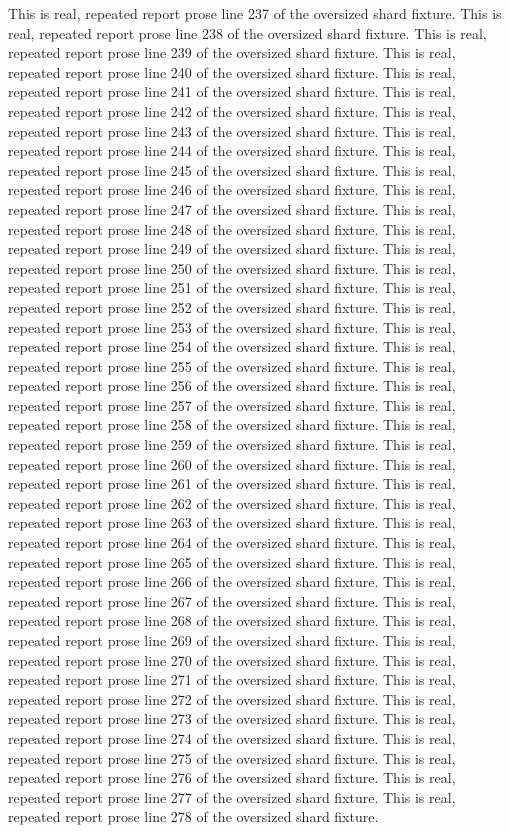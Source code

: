 This is real, repeated report prose line 237 of the oversized shard fixture.
This is real, repeated report prose line 238 of the oversized shard fixture.
This is real, repeated report prose line 239 of the oversized shard fixture.
This is real, repeated report prose line 240 of the oversized shard fixture.
This is real, repeated report prose line 241 of the oversized shard fixture.
This is real, repeated report prose line 242 of the oversized shard fixture.
This is real, repeated report prose line 243 of the oversized shard fixture.
This is real, repeated report prose line 244 of the oversized shard fixture.
This is real, repeated report prose line 245 of the oversized shard fixture.
This is real, repeated report prose line 246 of the oversized shard fixture.
This is real, repeated report prose line 247 of the oversized shard fixture.
This is real, repeated report prose line 248 of the oversized shard fixture.
This is real, repeated report prose line 249 of the oversized shard fixture.
This is real, repeated report prose line 250 of the oversized shard fixture.
This is real, repeated report prose line 251 of the oversized shard fixture.
This is real, repeated report prose line 252 of the oversized shard fixture.
This is real, repeated report prose line 253 of the oversized shard fixture.
This is real, repeated report prose line 254 of the oversized shard fixture.
This is real, repeated report prose line 255 of the oversized shard fixture.
This is real, repeated report prose line 256 of the oversized shard fixture.
This is real, repeated report prose line 257 of the oversized shard fixture.
This is real, repeated report prose line 258 of the oversized shard fixture.
This is real, repeated report prose line 259 of the oversized shard fixture.
This is real, repeated report prose line 260 of the oversized shard fixture.
This is real, repeated report prose line 261 of the oversized shard fixture.
This is real, repeated report prose line 262 of the oversized shard fixture.
This is real, repeated report prose line 263 of the oversized shard fixture.
This is real, repeated report prose line 264 of the oversized shard fixture.
This is real, repeated report prose line 265 of the oversized shard fixture.
This is real, repeated report prose line 266 of the oversized shard fixture.
This is real, repeated report prose line 267 of the oversized shard fixture.
This is real, repeated report prose line 268 of the oversized shard fixture.
This is real, repeated report prose line 269 of the oversized shard fixture.
This is real, repeated report prose line 270 of the oversized shard fixture.
This is real, repeated report prose line 271 of the oversized shard fixture.
This is real, repeated report prose line 272 of the oversized shard fixture.
This is real, repeated report prose line 273 of the oversized shard fixture.
This is real, repeated report prose line 274 of the oversized shard fixture.
This is real, repeated report prose line 275 of the oversized shard fixture.
This is real, repeated report prose line 276 of the oversized shard fixture.
This is real, repeated report prose line 277 of the oversized shard fixture.
This is real, repeated report prose line 278 of the oversized shard fixture.
